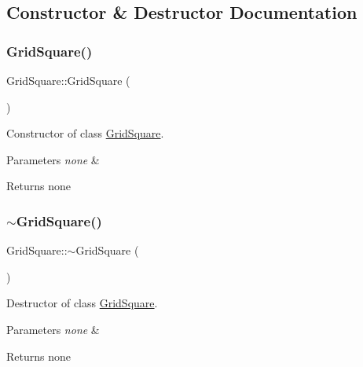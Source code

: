 \subsection{Constructor \& Destructor Documentation}
\mbox{\label{class_grid_square_a88fe5e8a65dec8e59dde719e4a99b043}} 
\subsubsection{\texorpdfstring{Grid\+Square()}{GridSquare()}}
{\footnotesize\ttfamily Grid\+Square\+::\+Grid\+Square (\begin{DoxyParamCaption}{ }\end{DoxyParamCaption})}



Constructor of class \hyperlink{class_grid_square}{Grid\+Square}. 


\begin{DoxyParams}{Parameters}
{\em none} & \\
\hline
\end{DoxyParams}
\begin{DoxyReturn}{Returns}
none 
\end{DoxyReturn}
\mbox{\label{class_grid_square_a59667a543b4501774304ea25d8cd5589}} 
\subsubsection{\texorpdfstring{$\sim$\+Grid\+Square()}{~GridSquare()}}
{\footnotesize\ttfamily Grid\+Square\+::$\sim$\+Grid\+Square (\begin{DoxyParamCaption}{ }\end{DoxyParamCaption})}



Destructor of class \hyperlink{class_grid_square}{Grid\+Square}. 


\begin{DoxyParams}{Parameters}
{\em none} & \\
\hline
\end{DoxyParams}
\begin{DoxyReturn}{Returns}
none 
\end{DoxyReturn}


